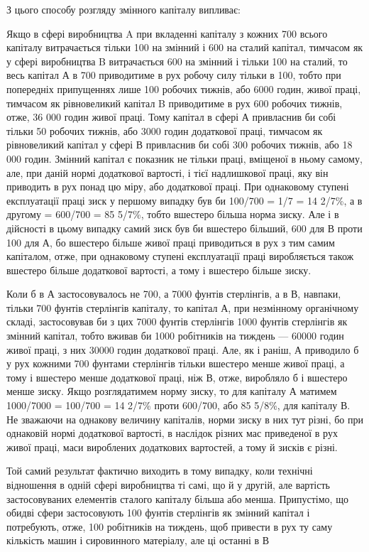 З цього способу розгляду змінного капіталу випливає:

Якщо в сфері виробництва A при вкладенні капіталу з кожних 700 всього капіталу витрачається тільки
100 на змінний
і 600 на сталий капітал, тимчасом як у сфері виробництва B
витрачається 600 на змінний і тільки 100 на сталий, то весь
капітал А в 700 приводитиме в рух робочу силу тільки в 100,
тобто при попередніх припущеннях лише 100 робочих тижнів,
або 6000 годин, живої праці, тимчасом як рівновеликий капітал B приводитиме в рух 600 робочих
тижнів, отже, 36 000 годин живої праці. Тому капітал в сфері А привласнив би собі тільки
50 робочих тижнів, або 3000 годин додаткової праці, тимчасом
як рівновеликий капітал у сфері В привласнив би собі 300 робочих тижнів, або 18 000 годин. Змінний
капітал є показник не
тільки праці, вміщеної в ньому самому, але, при даній нормі
додаткової вартості, і тієї надлишкової праці, яку він приводить
в рух понад цю міру, або додаткової праці. При однаковому
ступені експлуатації праці зиск у першому випадку був би 100/700 = 1/7 = 14 2/7\%, а в другому =
600/700 = 85 5/7\%, тобто вшестеро
більша норма зиску. Але і в дійсності в цьому випадку самий
зиск був би вшестеро більший, 600 для В проти 100 для А, бо
вшестеро більше живої праці приводиться в рух з тим самим
капіталом, отже, при однаковому ступені експлуатації праці
виробляється також вшестеро більше додаткової вартості, а тому
і вшестеро більше зиску.

Коли б в А застосовувалось не 700, а 7000 фунтів стерлінгів, а в В, навпаки, тільки 700 фунтів
стерлінгів капіталу, то
капітал А, при незмінному органічному складі, застосовував би
з цих 7000 фунтів стерлінгів 1000 фунтів стерлінгів як змінний
капітал, тобто вживав би 1000 робітників на тиждень — 60000 годин живої праці, з них 30000 годин
додаткової праці. Але,
як і раніш, А приводило б у рух кожними 700 фунтами стерлінгів тільки вшестеро менше живої праці, а
тому і вшестеро
менше додаткової праці, ніж В, отже, виробляло б і вшестеро
менше зиску. Якщо розглядатимем норму зиску, то для капіталу А матимем 1000/7000 = 100/700 = 14 2/7\%
проти 600/700, або 85 5/8\%, для
капіталу В. Не зважаючи на однакову величину капіталів, норми
зиску в них тут різні, бо при однаковій нормі додаткової
вартості, в наслідок різних мас приведеної в рух живої праці,
маси вироблених додаткових вартостей, а тому й зисків є різні.

Той самий результат фактично виходить в тому випадку, коли
технічні відношення в одній сфері виробництва ті самі, що й
у другій, але вартість застосовуваних елементів сталого капіталу більша або менша. Припустімо, що
обидві сфери застосовують 100 фунтів стерлінгів як змінний капітал і потребують, отже, 100
робітників на тиждень, щоб привести в рух ту саму
кількість машин і сировинного матеріалу, але ці останні в В

